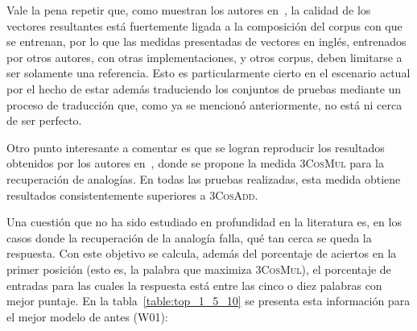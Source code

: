 Vale la pena repetir que, como muestran los autores en~\cite{Levy2015}, la calidad de los vectores
resultantes está fuertemente ligada a la composición del corpus con que se entrenan, por lo que las
medidas presentadas de vectores en inglés, entrenados por otros autores, con otras implementaciones,
y otros corpus, deben limitarse a ser solamente una referencia. Esto es particularmente cierto en el
escenario actual por el hecho de estar además traduciendo los conjuntos de pruebas mediante un
proceso de traducción que, como ya se mencionó anteriormente, no está ni cerca de ser perfecto.

Otro punto interesante a comentar es que se logran reproducir los resultados obtenidos por los
autores en~\cite{Levy2014b}, donde se propone la medida \textsc{3CosMul} para la recuperación de
analogías. En todas las pruebas realizadas, esta medida obtiene resultados consistentemente
superiores a \textsc{3CosAdd}.

Una cuestión que no ha sido estudiado en profundidad en la literatura es, en los casos donde la
recuperación de la analogía falla, qué tan cerca se queda la respuesta. Con este objetivo se
calcula, además del porcentaje de aciertos en la primer posición (esto es, la palabra que maximiza
\textsc{3CosMul}), el porcentaje de entradas para las cuales la respuesta está entre las cinco o
diez palabras con mejor puntaje. En la tabla~\ref{table:top_1_5_10} se presenta esta información
para el mejor modelo de antes (W01):


